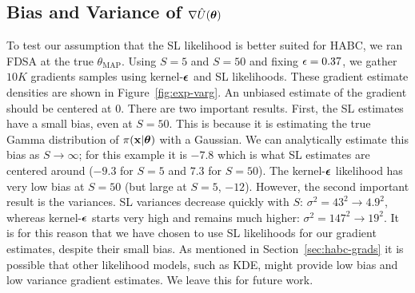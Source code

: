 \documentclass[]{article}
\begin{document}
 



\subsection{Bias and Variance of $\nabla \hat{U}({\bm \theta})$}
To test our assumption that the SL likelihood is better suited for HABC, we ran FDSA at the true $\theta_{\text{MAP}}$.  Using $S=5$ and $S=50$ and fixing $\epsilon = 0.37$, we gather $10K$ gradients samples using kernel-${\bm {\epsilon}}$ and SL likelihoods.  These gradient estimate densities are shown in Figure~\ref{fig:exp-varg}.  An unbiased estimate of the gradient should be centered at $0$.  There are two important results.  First, the SL estimates have a small bias, even at $S=50$.  This is because it is estimating the true Gamma distribution of $\pi({\bf x}|{\bm \theta})$ with a Gaussian.  We can analytically estimate this bias as $S \rightarrow \infty$; for this example it is $-7.8$ which is what SL estimates are centered around ($-9.3$ for $S=5$ and $7.3$ for $S=50$).  The kernel-${\bm {\epsilon}}$ likelihood has very low bias at $S=50$ (but large at $S=5$, $-12$).  However, the second important result is the variances.  SL variances decrease quickly with $S$: $\sigma^2 = 43^2 \rightarrow 4.9^2$, whereas kernel-${\bm {\epsilon}}$ starts very high and remains much higher: $\sigma^2 = 147^2 \rightarrow 19^2$.  It is for this reason that we have chosen to use SL likelihoods for our gradient estimates, despite their small bias. As mentioned in Section~\ref{sec:habc-grads} it is possible that other likelihood models, such as KDE, might provide low bias and low variance gradient estimates.  We leave this for future work.
%
%
\end{document}
